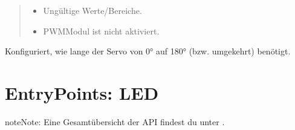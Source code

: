 \documentclass[letterpaper,10pt,english]{sphinxmanual}
\begin{document}
\begin{fulllineitems}
\begin{quote}
\begin{description}
\begin{itemize}
\item {} 
\sphinxAtStartPar
{} \textendash{} Ungültige Werte/Bereiche.

\item {} 
\sphinxAtStartPar
{} \textendash{} PWM\sphinxhyphen{}Modul ist nicht aktiviert.

\end{itemize}

\end{description}\end{quote}

\end{fulllineitems}


\sphinxAtStartPar
{}
Konfiguriert, wie lange der Servo von 0° auf 180° (bzw. umgekehrt) benötigt.

\sphinxAtStartPar
{}

\begin{sphinxVerbatim}[commandchars=\\\{\}]
\end{sphinxVerbatim}

\sphinxAtStartPar
{}

\begin{sphinxVerbatim}[commandchars=\\\{\}]
\end{sphinxVerbatim}

\sphinxstepscope


\chapter{Entry\sphinxhyphen{}Points: LED}
\label{\detokenize{agv_rest_api_led:entry-points-led}}\label{\detokenize{agv_rest_api_led::doc}}
\begin{sphinxadmonition}{note}{Note:}
\sphinxAtStartPar
Eine Gesamtübersicht der API findest du unter {\hyperref[\detokenize{index::doc}]{}}.
\end{sphinxadmonition}
\end{document}
